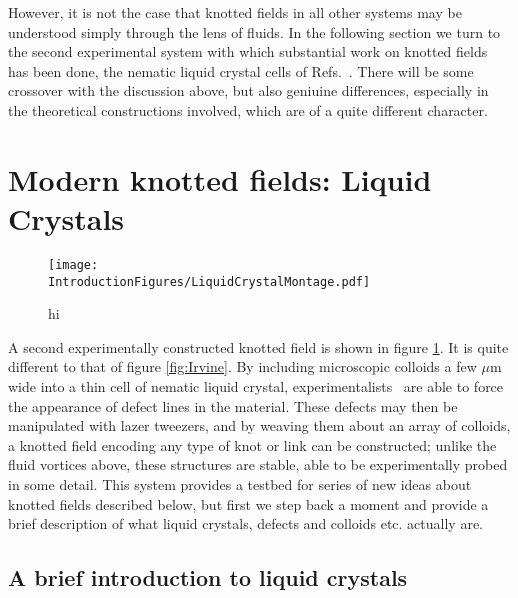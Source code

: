 However, it is not the case that knotted fields in all other systems may be understood simply through the lens of fluids. In the following section we turn to the second experimental system with which substantial work on knotted fields has been done, the nematic liquid crystal cells of Refs.~\citep{Tkalec2011,Tasinkevych2014,Copar2015}. There will be some crossover with the discussion above, but also geniuine differences, especially in the theoretical constructions involved, which are of a quite different character. 
\section{Modern knotted fields: Liquid Crystals}
\begin{figure}[htbp]
\centering
\texttt{[image: \\IntroductionFigures/LiquidCrystalMontage.pdf]}
\caption{hi }
\label{fig:KnottedLiquidCrystal}
\end{figure}
A second experimentally constructed knotted field is shown in figure \ref{fig:KnottedLiquidCrystal}. It is quite different to that of figure \ref{fig:Irvine}. By including microscopic colloids a few $\mu$m wide into a thin cell of nematic liquid crystal, experimentalists~\citep{Tkalec2011,Tasinkevych2014,Copar2015} are able to force the appearance of defect lines in the material. These defects may then be manipulated with lazer tweezers, and by weaving them about an array of colloids, a knotted field encoding any type of knot or link can be constructed; unlike the fluid vortices above, these structures are stable, able to be experimentally probed in some detail. This system provides a testbed for series of new ideas about knotted fields described below, but first we step back a moment and provide a brief description of what liquid crystals, defects and colloids etc. actually are.

\subsection{A brief introduction to liquid crystals}

